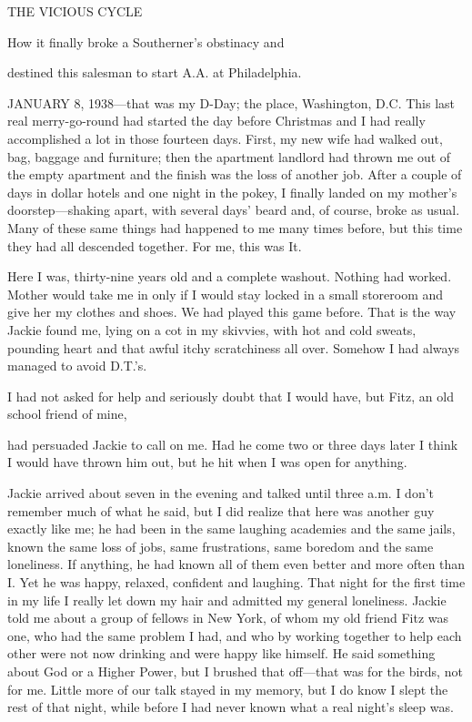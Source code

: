 
THE VICIOUS CYCLE

How it finally broke a Southerner’s obstinacy and

destined this salesman to start A.A. at Philadelphia.

 

      JANUARY 8, 1938—that was my D-Day; the place, Washington, D.C. This last real merry-go-round had started the day before Christmas and I had really accomplished a lot in those fourteen days. First, my new wife had walked out, bag, baggage and furniture; then the apartment landlord had thrown me out of the empty apartment and the finish was the loss of another job. After a couple of days in dollar hotels and one night in the pokey, I finally landed on my mother’s doorstep—shaking apart, with several days’ beard and, of course, broke as usual. Many of these same things had happened to me many times before, but this time they had all descended together. For me, this was It.

Here I was, thirty-nine years old and a complete washout. Nothing had worked. Mother would take me in only if I would stay locked in a small storeroom and give her my clothes and shoes. We had played this game before. That is the way Jackie found me, lying on a cot in my skivvies, with hot and cold sweats, pounding heart and that awful itchy scratchiness all over. Somehow I had always managed to avoid D.T.’s.

I had not asked for help and seriously doubt that I would have, but Fitz, an old school friend of mine,

had persuaded Jackie to call on me. Had he come two or three days later I think I would have thrown him out, but he hit when I was open for anything.

Jackie arrived about seven in the evening and talked until three a.m. I don’t remember much of what he said, but I did realize that here was another guy exactly like me; he had been in the same laughing academies and the same jails, known the same loss of jobs, same frustrations, same boredom and the same loneliness. If anything, he had known all of them even better and more often than I. Yet he was happy, relaxed, confident and laughing. That night for the first time in my life I really let down my hair and admitted my general loneliness. Jackie told me about a group of fellows in New York, of whom my old friend Fitz was one, who had the same problem I had, and who by working together to help each other were not now drinking and were happy like himself. He said something about God or a Higher Power, but I brushed that off—that was for the birds, not for me. Little more of our talk stayed in my memory, but I do know I slept the rest of that night, while before I had never known what a real night’s sleep was.

